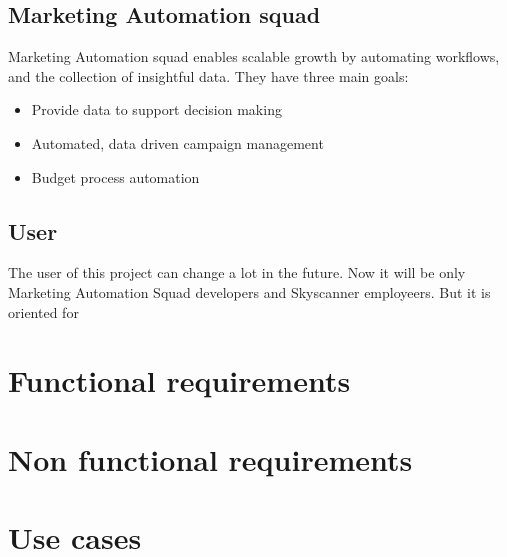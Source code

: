 \subsection{Marketing Automation squad} \label{mas}

Marketing Automation squad enables scalable growth by automating workflows, and the collection of insightful data. They have three main goals:

\begin{itemize}
  \item Provide data to support decision making
  \item Automated, data driven campaign management
  \item Budget process automation
\end{itemize}



\subsection{User}

The user of this project can change a lot in the future. Now it will be only Marketing Automation Squad developers and Skyscanner employeers. But it is oriented for 

\section{Functional requirements}

\section{Non functional requirements}

\section{Use cases}

